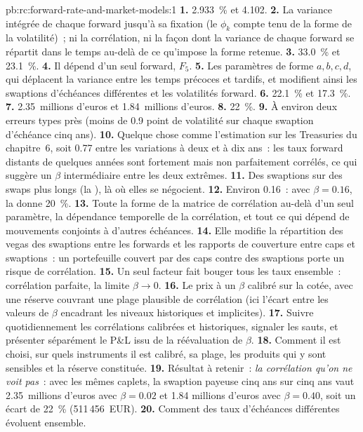 \begin{solution}{pb:rc:forward-rate-and-market-models:1}
\textbf{1.} 2.933~\% et 4.102.
\textbf{2.} La variance intégrée de chaque forward jusqu'à sa fixation (le $\phi_k$
compte tenu de la forme de la volatilité)~; ni la corrélation, ni la façon dont la variance de chaque forward
se répartit dans le temps au-delà de ce qu'impose la forme retenue.
\textbf{3.} 33.0~\% et 23.1~\%.
\textbf{4.} Il dépend d'un seul forward, $F_5$.
\textbf{5.} Les paramètres de forme $a,b,c,d$, qui déplacent la variance entre les temps
précoces et tardifs, et modifient ainsi les swaptions d'échéances différentes et les volatilités forward.
\textbf{6.} 22.1~\% et 17.3~\%.
\textbf{7.} 2.35~millions d'euros et 1.84~millions d'euros.
\textbf{8.} 22~\%.
\textbf{9.} À environ deux erreurs types près (moins de 0.9 point de volatilité sur chaque
swaption d'échéance cinq ans).
\textbf{10.} Quelque chose comme l'estimation sur les Treasuries du chapitre~6, soit 0.77 entre les variations à deux et
à dix ans~: les taux forward distants de quelques années sont fortement mais non parfaitement
corrélés, ce qui suggère un $\beta$ intermédiaire entre les deux extrêmes.
\textbf{11.} Des swaptions sur des swaps plus longs (la ), 
là où elles se négocient.
\textbf{12.} Environ 0.16~: avec $\beta=0.16$, la  donne 20~\%.
\textbf{13.} Toute la forme de la matrice de corrélation au-delà d'un seul paramètre, la
dépendance temporelle de la corrélation, et tout ce qui dépend de mouvements conjoints
à d'autres échéances.
\textbf{14.} Elle modifie la répartition des vegas des swaptions entre les forwards et les
rapports de couverture entre caps et swaptions~: un portefeuille couvert par des caps contre des swaptions
porte un risque de corrélation.
\textbf{15.} Un seul facteur fait bouger tous les taux ensemble~: corrélation parfaite, la limite
$\beta\to0$.
\textbf{16.} Le prix à un $\beta$ calibré sur la  cotée, avec une
réserve couvrant une plage plausible de corrélation (ici l'écart entre
les valeurs de $\beta$ encadrant les niveaux historiques et implicites).
\textbf{17.} Suivre quotidiennement les corrélations calibrées et historiques, signaler les sauts,
et présenter séparément le P\&L issu de la réévaluation de $\beta$.
\textbf{18.} Comment il est choisi, sur quels instruments il est calibré, sa plage, les
produits qui y sont sensibles et la réserve constituée.
\textbf{19.} Résultat à retenir~: \emph{la corrélation qu'on ne voit pas}~: avec les mêmes caplets,
la swaption payeuse cinq ans sur cinq ans vaut 2.35~millions d'euros avec $\beta=0.02$ et 1.84
millions d'euros avec $\beta=0.40$, soit un écart de 22~\% (511\,456~EUR).
\textbf{20.} Comment des taux d'échéances différentes évoluent ensemble.
\end{solution}

